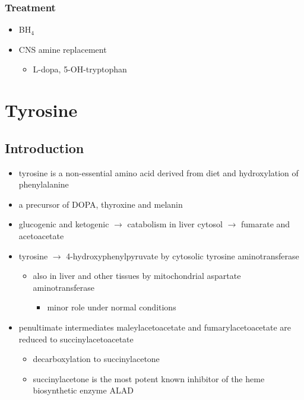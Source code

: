 \documentclass{scrartcl}
\begin{document}
\subsubsection{Treatment}
\label{sec:org65980e1}
\begin{itemize}
\item BH\(_{\text{4}}\)
\item CNS amine replacement
\begin{itemize}
\item L-dopa, 5-OH-tryptophan
\end{itemize}
\end{itemize}

\section{Tyrosine}
\label{sec:orga4aba5e}
\subsection{Introduction}
\label{sec:org9ba597b}
\begin{itemize}
\item tyrosine is a non-essential amino acid derived from diet and hydroxylation of phenylalanine
\item a precursor of DOPA, thyroxine and melanin
\item glucogenic and ketogenic \(\to\) catabolism in liver cytosol \(\to\) fumarate and acetoacetate
\item tyrosine \(\to\) 4-hydroxyphenylpyruvate by cytosolic tyrosine aminotransferase
\begin{itemize}
\item also in liver and other tissues by mitochondrial aspartate aminotransferase
\begin{itemize}
\item minor role under normal conditions
\end{itemize}
\end{itemize}
\item penultimate intermediates maleylacetoacetate and fumarylacetoacetate
are reduced to succinylacetoacetate
\begin{itemize}
\item decarboxylation to succinylacetone
\item succinylacetone is the most potent known inhibitor of the heme biosynthetic enzyme ALAD
\end{itemize}
\end{itemize}
\end{document}
